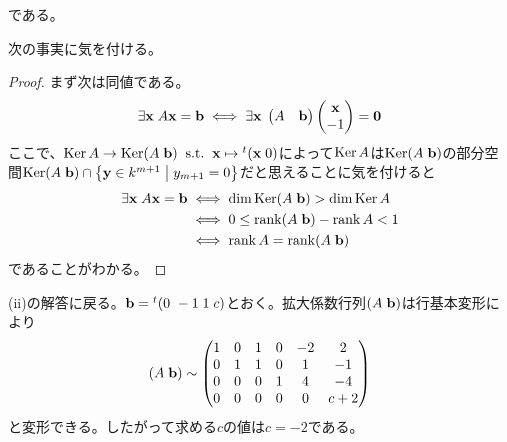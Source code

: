 \begin{sol}
\begin{description}
\[    \]
    である。
    \item[(ii)] 次の事実に気を付ける。
    \begin{proof}
      まず次は同値である。
      \[
        \exists \textbf{x} \; A\textbf{x} = \textbf{b} \iff \exists \textbf{x} \;  \begin{pmatrix} A & \textbf{b} \end{pmatrix} \begin{pmatrix} \textbf{x} \\ -1 \end{pmatrix} = \textbf{0}
      \]
      ここで、$\operatorname{Ker} A \to \operatorname{Ker} (A \; \textbf{b}) \; \; \text{s.t.} \; \; \textbf{x} \mapsto {}^t(\textbf{x} \; 0)$によって$\operatorname{Ker} A$は$\operatorname{Ker} (A \; \textbf{b})$の部分空間$\operatorname{Ker} (A \; \textbf{b}) \cap \left\{ \textbf{y} \in k^{m+1} \mathrel{} \middle| \mathrel{} y_{m+1}=0 \right\}$だと思えることに気を付けると
      \begin{align*}
      \exists \textbf{x} \; A\textbf{x} = \textbf{b} &\iff \dim \operatorname{Ker} (A \; \textbf{b}) > \dim  \operatorname{Ker} A \\
        &\iff 0 \leq \operatorname{rank} (A \; \textbf{b}) - \operatorname{rank} A < 1 \\
        &\iff \operatorname{rank} A = \operatorname{rank} (A \; \textbf{b})
      \end{align*}
      であることがわかる。
    \end{proof}
    (ii)の解答に戻る。$\textbf{b} = {}^t(0 \ -1 \;  1 \; c)$とおく。拡大係数行列$(A \; \textbf{b})$は行基本変形により
    \[
    (A \; \textbf{b}) \sim \begin{pmatrix} 1& 0& 1&  0& -2& 2 \\ 0 &1& 1& 0& 1& -1 \\ 0& 0& 0& 1& 4& -4 \\ 0& 0& 0& 0& 0& c+2 \end{pmatrix}
    \]
    と変形できる。したがって求める$c$の値は$c=-2$である。
  \end{description}
\end{sol}





\newpage





